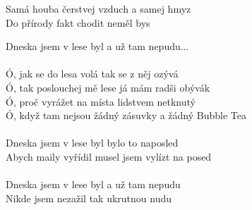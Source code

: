 Samá houba čerstvej vzduch a samej hmyz\\
Do přírody fakt chodit neměl bys
\begin{multicols}{2}
Dneska jsem v lese byl a už tam nepudu...\\
\\
Ó, jak se do lesa volá tak se z něj ozývá\\
Ó, tak poslouchej mě lese já mám radši obývák\\
Ó, proč vyrážet na místa lidstvem netknutý\\
Ó, když tam nejsou žádný zásuvky a žádný Bubble Tea\\
\columnbreak
\\
Dneska jsem v lese byl bylo to naposled\\
Abych maily vyřídil musel jsem vylízt na posed\\
\\
Dneska jsem v lese byl a už tam nepudu\\
Nikde jsem nezažil tak ukrutnou nudu
\end{multicols}